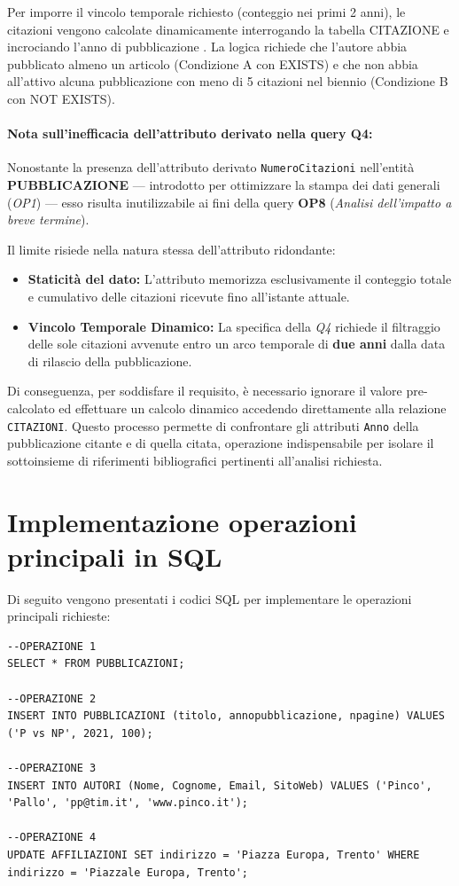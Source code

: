 \documentclass[a4paper,12pt]{article}
\begin{document}
Per imporre il vincolo temporale richiesto (conteggio nei primi 2 anni), le citazioni vengono calcolate dinamicamente interrogando la tabella CITAZIONE e incrociando l'anno di pubblicazione . La logica richiede che l'autore abbia pubblicato almeno un articolo (Condizione A con EXISTS) e che non abbia all'attivo alcuna pubblicazione con meno di 5 citazioni nel biennio (Condizione B con NOT EXISTS).

\paragraph{Nota sull'inefficacia dell'attributo derivato nella query Q4:}
Nonostante la presenza dell'attributo derivato \texttt{NumeroCitazioni} nell'entità \textbf{PUBBLICAZIONE} --- introdotto per ottimizzare la stampa dei dati generali (\textit{OP1}) --- esso risulta inutilizzabile ai fini della query \textbf{OP8} (\textit{Analisi dell'impatto a breve termine}).

Il limite risiede nella natura stessa dell'attributo ridondante:
\begin{itemize}
    \item \textbf{Staticità del dato:} L'attributo memorizza esclusivamente il conteggio totale e cumulativo delle citazioni ricevute fino all'istante attuale.
    \item \textbf{Vincolo Temporale Dinamico:} La specifica della \textit{Q4} richiede il filtraggio delle sole citazioni avvenute entro un arco temporale di \textbf{due anni} dalla data di rilascio della pubblicazione.
\end{itemize}

Di conseguenza, per soddisfare il requisito, è necessario ignorare il valore pre-calcolato ed effettuare un calcolo dinamico accedendo direttamente alla relazione \texttt{CITAZIONI}. Questo processo permette di confrontare gli attributi \texttt{Anno} della pubblicazione citante e di quella citata, operazione indispensabile per isolare il sottoinsieme di riferimenti bibliografici pertinenti all'analisi richiesta.
\section{Implementazione operazioni principali in SQL}
Di seguito vengono presentati i codici SQL per implementare le operazioni principali richieste:
\begin{lstlisting}
--OPERAZIONE 1
SELECT * FROM PUBBLICAZIONI;

--OPERAZIONE 2
INSERT INTO PUBBLICAZIONI (titolo, annopubblicazione, npagine) VALUES ('P vs NP', 2021, 100);

--OPERAZIONE 3
INSERT INTO AUTORI (Nome, Cognome, Email, SitoWeb) VALUES ('Pinco', 'Pallo', 'pp@tim.it', 'www.pinco.it');

--OPERAZIONE 4
UPDATE AFFILIAZIONI SET indirizzo = 'Piazza Europa, Trento' WHERE indirizzo = 'Piazzale Europa, Trento';

\end{lstlisting}
\newpage
\end{document}
